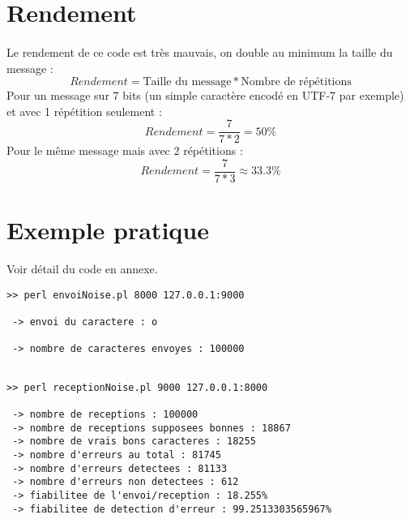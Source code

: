     \section{Rendement}

        \paragraph{}
Le rendement de ce code est très mauvais, on double au minimum la taille du message :
\[  Rendement = \text{Taille du message}*\text{Nombre de répétitions} \]
Pour un message sur 7 bits (un simple caractère encodé en UTF-7 par exemple) et avec 1 répétition seulement :
\[  Rendement = \frac{7}{7*2} = 50\% \]
Pour le même message mais avec 2 répétitions :
\[  Rendement = \frac{7}{7*3} \approx 33.3\% \]

    \section{Exemple pratique}

        \lstset{
            language=bash, basicstyle=\ttfamily\small, columns=flexible,
            tabsize=2, extendedchars=true, showspaces=false,
            showstringspaces=false, numbers=left, numberstyle=\tiny,
            breaklines=true, breakautoindent=true, captionpos=b
        }
Voir détail du code en annexe.
        \begin{lstlisting}
>> perl envoiNoise.pl 8000 127.0.0.1:9000

 -> envoi du caractere : o 
 
 -> nombre de caracteres envoyes : 100000

        \end{lstlisting}

        \begin{lstlisting}

>> perl receptionNoise.pl 9000 127.0.0.1:8000

 -> nombre de receptions : 100000
 -> nombre de receptions supposees bonnes : 18867
 -> nombre de vrais bons caracteres : 18255
 -> nombre d'erreurs au total : 81745
 -> nombre d'erreurs detectees : 81133
 -> nombre d'erreurs non detectees : 612
 -> fiabilitee de l'envoi/reception : 18.255%
 -> fiabilitee de detection d'erreur : 99.2513303565967%
 
        \end{lstlisting}
